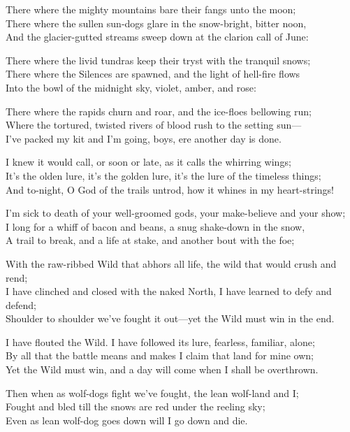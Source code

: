 
\begin{poemblock}
There where the mighty mountains bare their fangs unto the moon;\\
There where the sullen sun-dogs glare in the snow-bright, bitter noon,\\
And the glacier-gutted streams sweep down at the clarion call of June:

There where the livid tundras keep their tryst with the tranquil snows;\\
There where the Silences are spawned, and the light of hell-fire flows\\
Into the bowl of the midnight sky, violet, amber, and rose:

There where the rapids churn and roar, and the ice-floes bellowing run;\\
Where the tortured, twisted rivers of blood rush to the setting sun—\\
I've packed my kit and I'm going, boys, ere another day is done.

I knew it would call, or soon or late, as it calls the whirring wings;\\
It's the olden lure, it's the golden lure, it's the lure of the timeless things;\\
And to-night, O God of the trails untrod, how it whines in my heart-strings!

I'm sick to death of your well-groomed gods, your make-believe and your show;\\
I long for a whiff of bacon and beans, a snug shake-down in the snow,\\
A trail to break, and a life at stake, and another bout with the foe;

With the raw-ribbed Wild that abhors all life, the wild that would crush and rend;\\
I have clinched and closed with the naked North, I have learned to defy and defend;\\
Shoulder to shoulder we've fought it out—yet the Wild must win in the end.

I have flouted the Wild. I have followed its lure, fearless, familiar, alone;\\
By all that the battle means and makes I claim that land for mine own;\\
Yet the Wild must win, and a day will come when I shall be overthrown.

Then when as wolf-dogs fight we've fought, the lean wolf-land and I;\\
Fought and bled till the snows are red under the reeling sky;\\
Even as lean wolf-dog goes down will I go down and die.
\end{poemblock}
